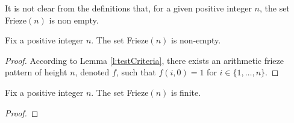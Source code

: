It is not clear from the definitions that, for a given positive integer $n$, the set Frieze$(n)$ is non empty.
\begin{lemma}
    \label{l:friezeNonEmpty}
    Fix a positive integer $n$. The set Frieze$(n)$ is non-empty.
\end{lemma}
\begin{proof}
    According to Lemma \ref{l:testCriteria}, there exists an arithmetic frieze pattern of height $n$, denoted $f$, such 
    that $f (i,0) = 1$ for $i \in \{1,\ldots , n\}$. 
\end{proof}
\begin{proposition}
    \label{prop:friezeFinite}
    Fix a positive integer $n$. The set Frieze$(n)$ is finite. 
\end{proposition}
\begin{proof}

\end{proof}